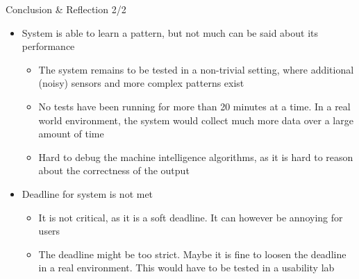 \begin{frame}{Conclusion \& Reflection 2/2}
	\begin{itemize}
    \item System is able to learn a pattern, but not much can be said about its performance
      \begin{itemize}
        \item The system remains to be tested in a non-trivial setting, where additional (noisy) sensors and more complex patterns exist
        \item No tests have been running for more than 20 minutes at a time. In a real world environment, the system would collect much more data over a large amount of time
        \item Hard to debug the machine intelligence algorithms, as it is hard to reason about the correctness of the output 
      \end{itemize}
		\item Deadline for system is not met
      \begin{itemize}
      \item It is not critical, as it is a soft deadline. It can however be annoying for users
      \item The deadline might be too strict. Maybe it is fine to loosen the deadline in a real environment. This would have to be tested in a usability lab
      \end{itemize}
	\end{itemize}
\end{frame}